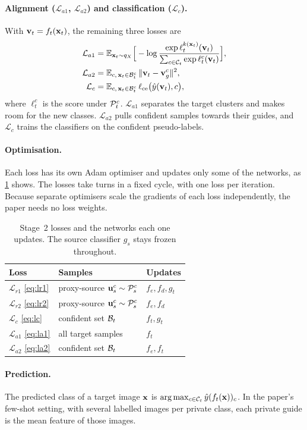 \paragraph{Alignment ($\mathcal{L}_{a1}$, $\mathcal{L}_{a2}$) and classification ($\mathcal{L}_{c}$).}
With $\mathbf{v}_t=f_t(\mathbf{x}_t)$, the remaining three losses are
\begin{align}
  \mathcal{L}_{a1} &= \mathbb{E}_{\mathbf{x}_t\sim q_X}\Big[-\log\frac{\exp\ell_t^{k(\mathbf{x}_t)}(\mathbf{v}_t)}{\sum_{c\in\mathcal{C}_t}\exp\ell_t^{c}(\mathbf{v}_t)}\Big],\label{eq:la1}\\
  \mathcal{L}_{a2} &= \mathbb{E}_{c,\,\mathbf{x}_t\in\mathcal{B}_t^c}\,\|\mathbf{v}_t-\mathbf{v}_g^c\|^2,\label{eq:la2}\\
  \mathcal{L}_{c}  &= \mathbb{E}_{c,\,\mathbf{x}_t\in\mathcal{B}_t^c}\,\ell_{\mathrm{ce}}\big(\hat{y}(\mathbf{v}_t),c\big),\label{eq:lc}
\end{align}
where $\ell_t^c$ is the score under $\mathcal{P}_t^c$.
$\mathcal{L}_{a1}$ separates the target clusters and makes room for the new classes.
$\mathcal{L}_{a2}$ pulls confident samples towards their guides, and $\mathcal{L}_{c}$ trains the classifiers on the confident pseudo-labels.

\paragraph{Optimisation.}
Each loss has its own Adam optimiser and updates only some of the networks, as \cref{tab:losses} shows.
The losses take turns in a fixed cycle, with one loss per iteration.
Because separate optimisers scale the gradients of each loss independently, the paper needs no loss weights.

\begin{table}[t]
  \centering
  \small
  \caption{Stage~2 losses and the networks each one updates. The source classifier $g_s$ stays frozen throughout.}
  \label{tab:losses}
  \begin{tabular}{@{}lll@{}}
    \toprule
    Loss & Samples & Updates \\
    \midrule
    $\mathcal{L}_{r1}$ \eqref{eq:lr1} & proxy-source $\mathbf{u}_s^c\sim\mathcal{P}_s^c$ & $f_e, f_d, g_t$ \\
    $\mathcal{L}_{r2}$ \eqref{eq:lr2} & proxy-source $\mathbf{u}_s^c\sim\mathcal{P}_s^c$ & $f_e, f_d$ \\
    $\mathcal{L}_{c}$ \eqref{eq:lc}   & confident set $\mathcal{B}_t$              & $f_t, g_t$ \\
    $\mathcal{L}_{a1}$ \eqref{eq:la1} & all target samples               & $f_t$ \\
    $\mathcal{L}_{a2}$ \eqref{eq:la2} & confident set $\mathcal{B}_t$              & $f_e, f_t$ \\
    \bottomrule
  \end{tabular}
\end{table}

\paragraph{Prediction.}
The predicted class of a target image $\mathbf{x}$ is $\arg\max_{c\in\mathcal{C}_t}\hat{y}(f_t(\mathbf{x}))_c$.
In the paper's few-shot setting, with several labelled images per private class, each private guide is the mean feature of those images.
